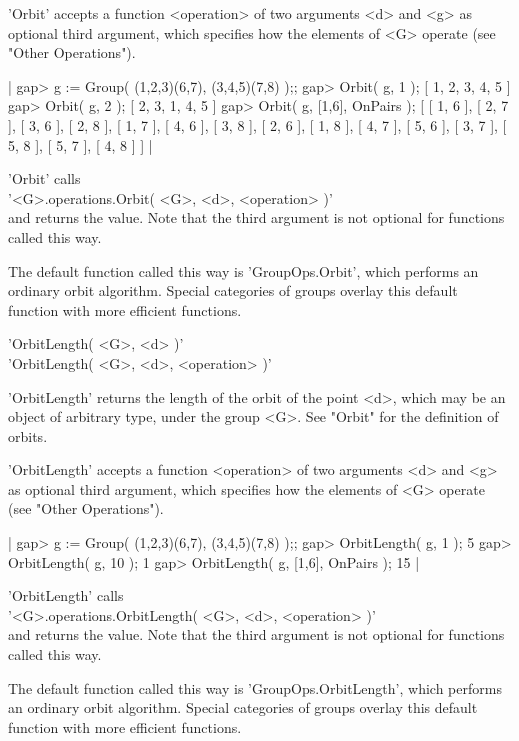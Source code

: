'Orbit' accepts a  function <operation> of two  arguments <d>  and <g> as
optional third argument, which specifies how the elements of <G>  operate
(see "Other Operations").

|    gap> g := Group( (1,2,3)(6,7), (3,4,5)(7,8) );;
    gap> Orbit( g, 1 );
    [ 1, 2, 3, 4, 5 ]
    gap> Orbit( g, 2 );
    [ 2, 3, 1, 4, 5 ]
    gap> Orbit( g, [1,6], OnPairs );
    [ [ 1, 6 ], [ 2, 7 ], [ 3, 6 ], [ 2, 8 ], [ 1, 7 ], [ 4, 6 ],
      [ 3, 8 ], [ 2, 6 ], [ 1, 8 ], [ 4, 7 ], [ 5, 6 ], [ 3, 7 ],
      [ 5, 8 ], [ 5, 7 ], [ 4, 8 ] ] |

'Orbit' calls \\
'<G>.operations.Orbit( <G>, <d>, <operation> )' \\
and returns the value.  Note that the third argument  is not optional for
functions called this way.

The default function called this  way is 'GroupOps.Orbit', which performs
an ordinary orbit algorithm.  Special  categories of groups  overlay this
default function with more efficient functions.


'OrbitLength( <G>, <d> )' \\
'OrbitLength( <G>, <d>, <operation> )'

'OrbitLength' returns the length of the orbit of the point <d>, which may
be an object of arbitrary type, under the group <G>.  See "Orbit" for the
definition of orbits.

'OrbitLength' accepts a function <operation> of two arguments <d> and <g>
as  optional third  argument,  which specifies how  the  elements  of <G>
operate (see "Other Operations").

|    gap> g := Group( (1,2,3)(6,7), (3,4,5)(7,8) );;
    gap> OrbitLength( g, 1 );
    5
    gap> OrbitLength( g, 10 );
    1
    gap> OrbitLength( g, [1,6], OnPairs );
    15 |

'OrbitLength' calls \\
'<G>.operations.OrbitLength( <G>, <d>, <operation> )' \\
and returns the value.  Note that the third argument is  not optional for
functions called this way.

The  default  function called this way   is 'GroupOps.OrbitLength', which
performs an  ordinary   orbit  algorithm.  Special categories  of  groups
overlay this default function with more efficient functions.


